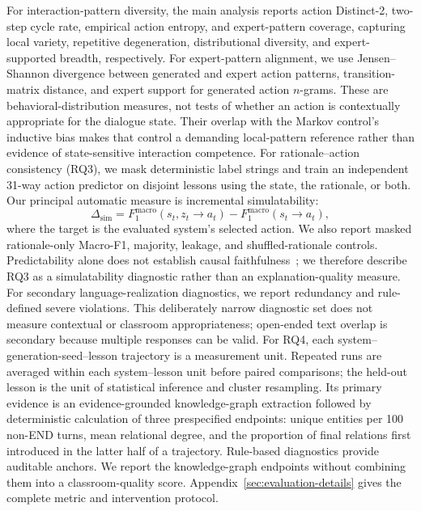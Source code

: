 \documentclass[manuscript,review,anonymous]{acmart}
\begin{document}
For interaction-pattern diversity, the main analysis reports action Distinct-2, two-step cycle rate, empirical action entropy, and expert-pattern coverage, capturing local variety, repetitive degeneration, distributional diversity, and expert-supported breadth, respectively.
For expert-pattern alignment, we use Jensen--Shannon divergence between generated and expert action patterns, transition-matrix distance, and expert support for generated action $n$-grams. These are behavioral-distribution measures, not tests of whether an action is contextually appropriate for the dialogue state. Their overlap with the Markov control's inductive bias makes that control a demanding local-pattern reference rather than evidence of state-sensitive interaction competence.
For rationale--action consistency (RQ3), we mask deterministic label strings and train an independent 31-way action predictor on disjoint lessons using the state, the rationale, or both.
Our principal automatic measure is incremental simulatability:
\begin{equation}
\Delta_{\mathrm{sim}}
=
F_{1}^{\mathrm{macro}}(s_t,z_t\!\rightarrow\!a_t)
-
F_{1}^{\mathrm{macro}}(s_t\!\rightarrow\!a_t),
\label{eq:g3-simulatability}
\end{equation}
where the target is the evaluated system's selected action.
We also report masked rationale-only Macro-F1, majority, leakage, and shuffled-rationale controls. Predictability alone does not establish causal faithfulness~\citep{hase2020leakage,jacovi2020faithfully}; we therefore describe RQ3 as a simulatability diagnostic rather than an explanation-quality measure.
For secondary language-realization diagnostics, we report redundancy and
rule-defined severe violations. This deliberately narrow diagnostic set does
not measure contextual or classroom appropriateness; open-ended text overlap is
secondary because multiple responses can be valid.
For RQ4, each system--generation-seed--lesson trajectory is a measurement
unit. Repeated runs are averaged within each system--lesson unit before
paired comparisons; the held-out lesson is the unit of statistical inference
and cluster resampling. Its primary evidence
is an evidence-grounded knowledge-graph extraction followed by deterministic
calculation of three prespecified endpoints: unique entities per 100 non-END
turns, mean relational degree, and the proportion of final relations first
introduced in the latter half of a trajectory. Rule-based diagnostics provide
auditable anchors. We report the knowledge-graph endpoints without combining
them into a classroom-quality score.
Appendix~\ref{sec:evaluation-details} gives the complete metric and intervention protocol.
\end{document}
